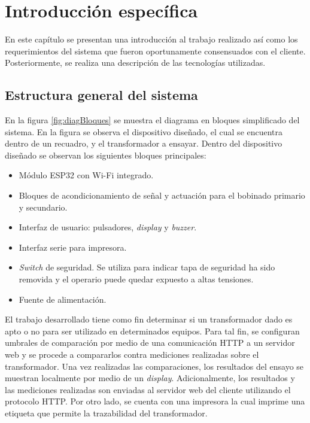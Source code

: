 \chapter{Introducción específica} %
\label{Chapter2}

En este capítulo se presentan una introducción al trabajo realizado así como los requerimientos del sistema que fueron oportunamente consensuados con el cliente. Posteriormente, se realiza una descripción de las tecnologías utilizadas.

\section{Estructura general del sistema}

En la figura \ref{fig:diagBloques} se muestra el diagrama en bloques simplificado del sistema. En la figura se observa el dispositivo diseñado, el cual se encuentra dentro de un recuadro, y el transformador a ensayar. Dentro del dispositivo diseñado se observan los siguientes bloques principales:

\begin{itemize}
\item Módulo ESP32 con Wi-Fi integrado.
\item Bloques de acondicionamiento de señal y actuación para el bobinado primario y secundario.
\item Interfaz de usuario: pulsadores, \textit{display} y \textit{buzzer}.
\item Interfaz serie para impresora.
\item \textit{Switch} de seguridad. Se utiliza para indicar tapa de seguridad ha sido removida y el operario puede quedar expuesto a altas tensiones.
\item Fuente de alimentación.
\end{itemize}

El trabajo desarrollado tiene como fin determinar si un transformador dado es apto o no para ser utilizado en determinados equipos. Para tal fin, se configuran umbrales de comparación por medio de una comunicación HTTP a un servidor web y se procede a compararlos contra mediciones realizadas sobre el transformador. Una vez realizadas las comparaciones, los resultados del ensayo se muestran localmente por medio de un \textit{display}. Adicionalmente, los resultados y las mediciones realizadas son enviadas al servidor web del cliente utilizando el protocolo HTTP. Por otro lado, se cuenta con una impresora la cual imprime una etiqueta que permite la trazabilidad del transformador.

